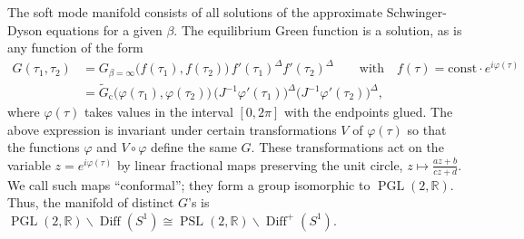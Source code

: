 \documentclass[12pt]{article}
\newcommand{\RR}{\mathbb{R}}
\newcommand{\const}{\mathrm{const}}
\DeclareMathOperator{\PSL}{PSL}
\DeclareMathOperator{\Diff}{Diff}
\newcommand{\cc}{\mathrm{c}}
\newcommand{\tG}{\widetilde{G}}
\newcommand{\vp}{\varphi}
\begin{document}
The soft mode manifold consists of all solutions of the approximate Schwinger-Dyson equations for a given $\beta$. The equilibrium Green function is a solution, as is any function of the form
\begin{equation}
\label{Gphi-1}
\begin{aligned}
G(\tau_1,\tau_2) 
&=G_{\beta=\infty}\bigl(f(\tau_1),f(\tau_2)\bigr)\,
f'(\tau_1)^{\Delta}f'(\tau_2)^{\Delta}\qquad
\text{with}\quad f(\tau)=\const\cdot e^{i\vp(\tau)}
\\[3pt]
&=\tG_{\cc}\bigl(\vp(\tau_1),\vp(\tau_2)\bigr)\,
\bigl(J^{-1}\vp'(\tau_1)\bigr)^{\Delta}
\bigl(J^{-1}\vp'(\tau_2)\bigr)^{\Delta},
\end{aligned}
\end{equation}
where $\vp(\tau)$ takes values in the interval $[0,2\pi]$ with the endpoints glued. The above expression is invariant under certain  transformations $V$ of $\vp(\tau)$ so that the functions $\vp$ and $V\circ\vp$ define the same $G$. These transformations act on the variable $z=e^{i\vp(\tau)}$ by linear fractional maps preserving the unit circle, $z\mapsto\frac{az+b}{cz+d}$. We call such maps ``conformal''; they form a group isomorphic to $\operatorname{PGL}(2,\RR)$. Thus, the manifold of distinct $G$'s is $\operatorname{PGL}(2,\RR)\backslash\Diff(S^1) \cong\PSL(2,\RR)\backslash\Diff^{+}(S^1)$.
\end{document}

